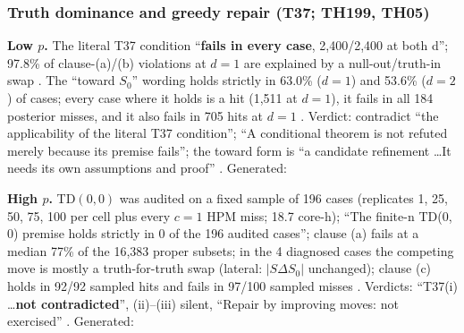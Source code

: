 \subsubsection{Truth dominance and greedy repair (T37; TH199, TH05)}
\textbf{Low $p$.} The literal T37 condition ``\textbf{fails in every case}, 2,400/2,400 at both d''; 97.8\% of clause-(a)/(b) violations at
$d=1$ are explained by a null-out/truth-in swap . The ``toward $S_0$''
wording holds strictly in 63.0\% ($d=1$) and 53.6\% ($d=2$) of cases; every case where it holds is a hit (1,511 at $d=1$), it fails in
all 184 posterior misses, and it also fails in 705 hits at $d=1$ .
Verdict: contradict ``the applicability of the literal T37 condition''; ``A conditional theorem is not refuted merely because its premise
fails''; the toward form is ``a candidate refinement \dots It needs its own assumptions and proof''
. Generated:

\textbf{High $p$.} TD$(0,0)$ was audited on a fixed sample of 196 cases (replicates 1, 25, 50, 75, 100 per cell plus every $c=1$ HPM miss;
18.7 core-h); ``The finite-n TD(0, 0) premise holds strictly in 0 of the 196 audited cases''; clause (a) fails at a median 77\% of the 16,383
proper subsets; in the 4 diagnosed cases the competing move is mostly a truth-for-truth swap (lateral: $|S\Delta S_0|$ unchanged);
clause (c) holds in 92/92 sampled hits and fails in 97/100 sampled misses
. Verdicts: ``T37(i) \dots \textbf{not contradicted}'', (ii)--(iii)
silent, ``Repair by improving moves: not exercised'' . Generated:


